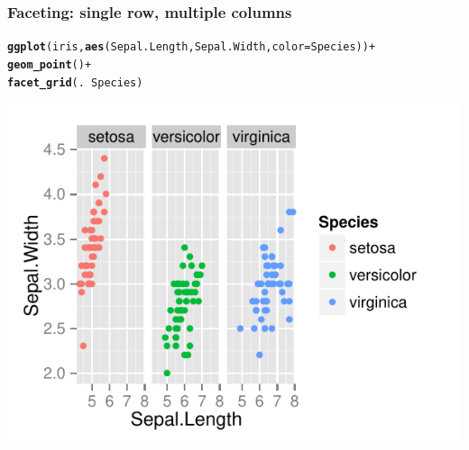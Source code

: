\documentclass{beamer}\usepackage[]{graphicx}\usepackage[]{color}
\makeatletter
\newcommand{\hlopt}[1]{\textcolor[rgb]{0,0,0}{#1}}%
\newcommand{\hlstd}[1]{\textcolor[rgb]{0.345,0.345,0.345}{#1}}%
\newcommand{\hlkwc}[1]{\textcolor[rgb]{0.333,0.667,0.333}{#1}}%
\newcommand{\hlkwd}[1]{\textcolor[rgb]{0.737,0.353,0.396}{\textbf{#1}}}%
\newenvironment{kframe}{%
 \def\at@end@of@kframe{}%
 \ifinner\ifhmode%
  \def\at@end@of@kframe{\end{minipage}}%
  \begin{minipage}{\columnwidth}%
 \fi\fi%
 \def\FrameCommand##1{\hskip\@totalleftmargin \hskip-\fboxsep
 \colorbox{shadecolor}{##1}\hskip-\fboxsep
     \hskip-\linewidth \hskip-\@totalleftmargin \hskip\columnwidth}%
 \MakeFramed {\advance\hsize-\width
   \@totalleftmargin\z@ \linewidth\hsize
   \@setminipage}}%
 {\par\unskip\endMakeFramed%
 \at@end@of@kframe}
\newenvironment{knitrout}{}{} %
\makeatother
\begin{document}
\begin{frame}[fragile]
\frametitle{Faceting: single row, multiple columns}
\begin{knitrout}\footnotesize
{}\color{fgcolor}\begin{kframe}
\begin{alltt}
\hlkwd{ggplot}\hlstd{(iris,} \hlkwd{aes}\hlstd{(Sepal.Length, Sepal.Width,} \hlkwc{color} \hlstd{= Species))} \hlopt{+}
\hlkwd{geom_point}\hlstd{()} \hlopt{+}
\hlkwd{facet_grid}\hlstd{(.} \hlopt{~} \hlstd{Species)}
\end{alltt}
\end{kframe}

{\centering \includegraphics[width=.75\linewidth]{figure/facet_grid2} 

}



\end{knitrout}
\end{frame}

\end{document}
